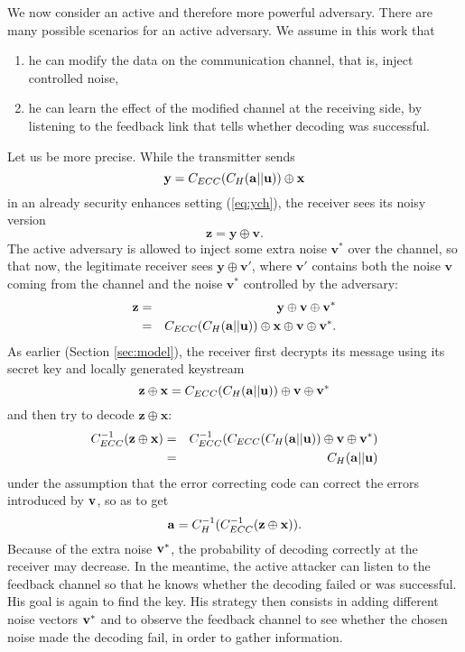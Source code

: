 \documentclass{article}[11pt]
\newcommand{\vv}{\mathbf{v}}
\newcommand{\xv}{\mathbf{x}}
\newcommand{\yv}{\mathbf{y}}
\newcommand{\zv}{\mathbf{z}}
\begin{document}
We now consider an active and therefore more powerful adversary.
There are many possible scenarios for an active adversary. We assume in this work
that
\begin{enumerate}
\item
he can modify the data on the communication channel, that is, inject controlled noise,
\item
he can learn the effect of the modified channel at the receiving side, by listening
to the feedback link that tells whether decoding was successful.
\end{enumerate}
Let us be more precise. While the transmitter sends
\[
{\bf y} = C_{ECC}(C_H({\bf a}||{\bf u}))\oplus {\bf x}
\]
in an already security enhances setting (\ref{eq:ych}), the receiver sees
its noisy version
\[
\zv=\yv \oplus \vv.
\]
The active adversary is allowed to inject some extra noise $\vv^*$ over the channel,
so that now, the legitimate receiver sees $\yv\oplus\vv'$, where $\vv'$ contains both the noise $\vv$
coming from the channel and the noise $\vv^*$ controlled by the adversary:
\begin{eqnarray}
{\bf z} & =&  {\bf y} \oplus {\bf v} \oplus {\bf v}^* \nonumber \\
        & =&  C_{ECC}(C_H({\bf a}||{\bf u}))\oplus {\bf x}\oplus
              {\bf v} \oplus {\bf v}^*. \label{eq:zactive}
\end{eqnarray}
As earlier (Section \ref{sec:model}), the receiver first decrypts
its message using its secret key and locally generated keystream
\[
\zv\oplus\xv = C_{ECC}(C_H({\bf a}||{\bf u}))\oplus {\bf v} \oplus{\bf v}^*
\]
and then try to decode $\zv\oplus\xv$:
\begin{eqnarray*}
C_{ECC}^{-1}({\bf z} \oplus {\bf x})
&=& C_{ECC}^{-1}(C_{ECC}(C_H({\bf a}||{\bf u}))\oplus {\bf v} \oplus {\bf v}^* )\\
&=& C_H({\bf a}||{\bf u})
\end{eqnarray*}
under the assumption that the error correcting code can correct the
errors introduced by ${\bf v}$, so as to get
\[
{\bf a} = C_H^{-1}(C_{ECC}^{-1}({\bf z} \oplus {\bf x})).
\]
Because of the extra noise ${\bf v}^*$, the probability of decoding correctly at the
receiver may decrease.
In the meantime, the active attacker can listen to the feedback
channel so that he knows whether the decoding failed or was successful.
His goal is again to find the key. His strategy then consists in adding
different noise vectors ${\bf v}^*$ and to observe the feedback
channel to see whether the chosen noise made the decoding fail, in order to
gather information.
\end{document}
